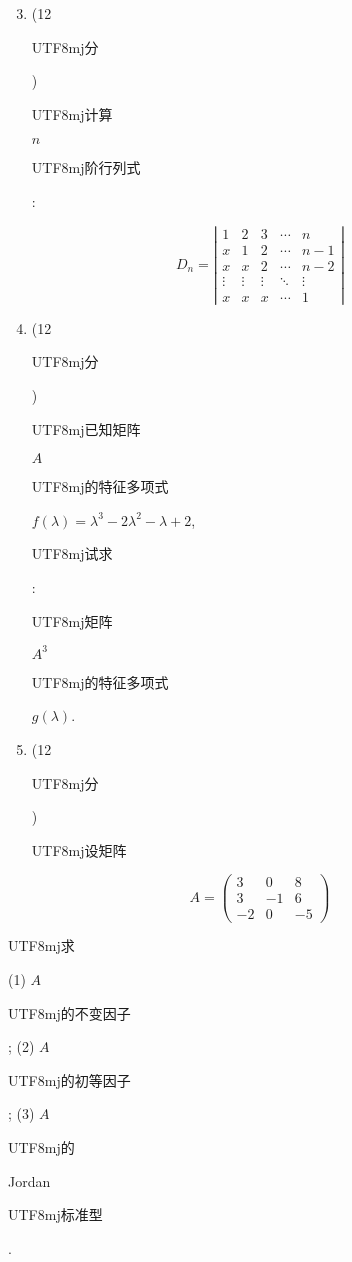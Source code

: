 \documentclass[10pt]{article}
\begin{document}
\begin{enumerate}
  \setcounter{enumi}{2}
  \item (12 \begin{CJK}{UTF8}{mj}分\end{CJK}) \begin{CJK}{UTF8}{mj}计算\end{CJK} $n$ \begin{CJK}{UTF8}{mj}阶行列式\end{CJK}:
\end{enumerate}
$$
D_{n}=\left|\begin{array}{ccccc}
1 & 2 & 3 & \cdots & n \\
x & 1 & 2 & \cdots & n-1 \\
x & x & 2 & \cdots & n-2 \\
\vdots & \vdots & \vdots & \ddots & \vdots \\
x & x & x & \cdots & 1
\end{array}\right|
$$

\begin{enumerate}
  \setcounter{enumi}{3}
  \item (12 \begin{CJK}{UTF8}{mj}分\end{CJK}) \begin{CJK}{UTF8}{mj}已知矩阵\end{CJK} $A$ \begin{CJK}{UTF8}{mj}的特征多项式\end{CJK} $f(\lambda)=\lambda^{3}-2 \lambda^{2}-\lambda+2$, \begin{CJK}{UTF8}{mj}试求\end{CJK}: \begin{CJK}{UTF8}{mj}矩阵\end{CJK} $A^{3}$ \begin{CJK}{UTF8}{mj}的特征多项式\end{CJK} $g(\lambda)$.

  \item (12 \begin{CJK}{UTF8}{mj}分\end{CJK}) \begin{CJK}{UTF8}{mj}设矩阵\end{CJK}

\end{enumerate}
$$
A=\left(\begin{array}{ccc}
3 & 0 & 8 \\
3 & -1 & 6 \\
-2 & 0 & -5
\end{array}\right)
$$
\begin{CJK}{UTF8}{mj}求\end{CJK} (1) $A$ \begin{CJK}{UTF8}{mj}的不变因子\end{CJK}; (2) $A$ \begin{CJK}{UTF8}{mj}的初等因子\end{CJK}; (3) $A$ \begin{CJK}{UTF8}{mj}的\end{CJK} Jordan \begin{CJK}{UTF8}{mj}标准型\end{CJK}.
\end{document}
